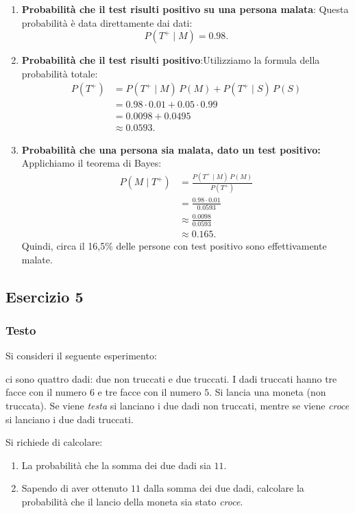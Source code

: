 \begin{enumerate}
    \item \textbf{Probabilità che il test risulti positivo su una persona malata}: Questa probabilità è data direttamente dai dati:
    \[
        P(T^+ \mid M)=0.98.
    \]
    
    \item \textbf{Probabilità che il test risulti positivo}:Utilizziamo la formula della probabilità totale:
    \[
    \begin{split}
    P(T^+) &= P(T^+ \mid M) \, P(M) + P(T^+ \mid S) \, P(S) \\
    &= 0.98 \cdot 0.01 + 0.05 \cdot 0.99 \\
    &= 0.0098 + 0.0495 \\
    &\approx 0.0593.
    \end{split}
    \]
    
    \item \textbf{Probabilità che una persona sia malata, dato un test positivo:}\\[1mm]
    Applichiamo il teorema di Bayes:
    \[
    \begin{split}
    P(M \mid T^+) &= \frac{P(T^+ \mid M) \, P(M)}{P(T^+)} \\
    &= \frac{0.98 \cdot 0.01}{0.0593} \\
    &\approx \frac{0.0098}{0.0593} \\
    &\approx 0.165.
    \end{split}
    \]
    Quindi, circa il 16,5\% delle persone con test positivo sono effettivamente malate.    
\end{enumerate}

\subsection{Esercizio 5}
\subsubsection{Testo}
Si consideri il seguente esperimento:

    ci sono quattro dadi: due non truccati e due truccati. I dadi truccati hanno tre facce con il numero \(6\) e tre facce con il numero \(5\). Si lancia una moneta (non truccata). Se viene \emph{testa} si lanciano i due dadi non truccati, mentre se viene \emph{croce} si lanciano i due dadi truccati.

Si richiede di calcolare:
\begin{enumerate}[label=(\alph*)]
    \item La probabilità che la somma dei due dadi sia \(11\).
    \item Sapendo di aver ottenuto \(11\) dalla somma dei due dadi, calcolare la probabilità che il lancio della moneta sia stato \emph{croce}.
\end{enumerate}

